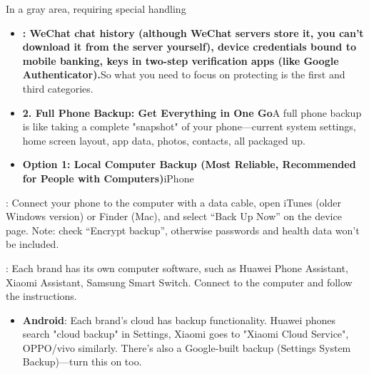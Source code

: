 


In a gray area, requiring special handling

\begin{itemize}
  \item \textbf{: WeChat chat history (although WeChat servers store it, you can't download it from the server yourself), device credentials bound to mobile banking, keys in two-step verification apps (like Google Authenticator).}So what you need to focus on protecting is the first and third categories.
  \item \textbf{2. Full Phone Backup: Get Everything in One Go}A full phone backup is like taking a complete "snapshot" of your phone—current system settings, home screen layout, app data, photos, contacts, all packaged up.
  \item \textbf{Option 1: Local Computer Backup (Most Reliable, Recommended for People with Computers)}iPhone
\end{itemize}

: Connect your phone to the computer with a data cable, open iTunes (older Windows version) or Finder (Mac), and select “Back Up Now” on the device page. Note: check “Encrypt backup”, otherwise passwords and health data won't be included.


: Each brand has its own computer software, such as Huawei Phone Assistant, Xiaomi Assistant, Samsung Smart Switch. Connect to the computer and follow the instructions.


\begin{itemize}
  \item \textbf{Android}: Each brand's cloud has backup functionality. Huawei phones search "cloud backup" in Settings, Xiaomi goes to "Xiaomi Cloud Service", OPPO/vivo similarly. There's also a Google-built backup (Settings System Backup)—turn this on too.
\end{itemize}

